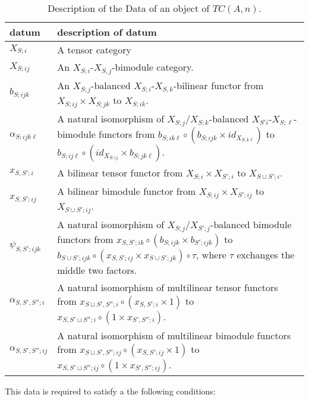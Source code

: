\documentclass{amsart}
\begin{document}
\begin{table}[ht]
	\caption{Description of the Data of an object of $TC(A,n)$.}	
	\begin{tabular}{l p{11cm}}
		datum & description of datum \\ \hline
		$X_{S;i}$ & A tensor category \\
		$X_{S;ij}$ & An $X_{S;i}$-$X_{S,j}$-bimodule category. \\
		$b_{S; ijk}$ & An $X_{S;j}$-balanced $X_{S;i}$-$X_{S,k}$-bilinear functor from $X_{S;ij}\times X_{S;jk}$ to $X_{S;ik}$. \\
		$\alpha_{S;ijk \ell}$  & A natural isomorphism of $X_{S;j}$/$X_{S;k}$-balanced $X_{S'i}$-$X_{S;\ell}$-bimodule functors from $b_{S;i k \ell} \circ (b_{S;ijk} \times id_{X_{S;k\ell}})$ to $b_{S;ij \ell} \circ (id_{X_{S;ij}} \times b_{S;jk\ell})$. \\ \hline
		$x_{S, S';i}$ & A bilinear tensor functor from $X_{S;i} \times X_{S';i}$ to $X_{S \cup S'; i}$. \\
		$x_{S, S';ij}$ & A bilinear bimodule functor from $X_{S;ij} \times X_{S';ij}$ to $X_{S \cup S'; ij}$. \\
		$\psi_{S, S'; i j k}$ & A natural isomorphism of $X_{S;j} / X_{S';j}$-balanced bimodule functors from $x_{S,S'; ik} \circ (b_{S; ijk} \times b_{S';ijk})$ to $b_{S \cup S'; ijk} \circ (x_{S,S';ij} \times x_{S \cup S'; jk}) \circ  \tau $, where $\tau$ exchanges the middle two factors.  \\ \hline
		$\alpha_{S, S', S'';i}$ & A natural isomorphism of multilinear tensor functors from
		$x_{S \sqcup S', S'';i}\circ (x_{S,S';i} \times 1)$  to 
		$x_{S, S' \sqcup S'';i} \circ (1 \times x_{S', S'';i})$. \\
		$\alpha_{S, S', S'';ij}$ & A natural isomorphism of multilinear bimodule functors from
		$x_{S \sqcup S', S'';ij}\circ (x_{S,S';ij} \times 1)$  to 
		$x_{S, S' \sqcup S'';ij} \circ (1 \times x_{S', S'';ij})$. \\
	\end{tabular}
	\label{Table:ObjectOfTC2}
\end{table}
This data is required to satisfy a the following conditions: \\
\end{document}
